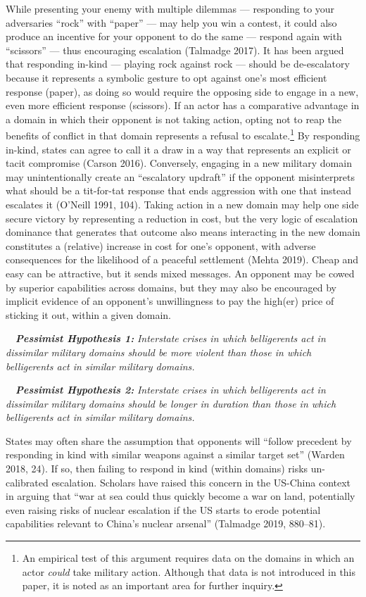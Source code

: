 \documentclass[
]{article}
\begin{document}
While presenting your enemy with multiple dilemmas --- responding to your adversaries ``rock'' with ``paper'' --- may help you win a contest, it could also produce an incentive for your opponent to do the same --- respond again with ``scissors'' --- thus encouraging escalation (Talmadge 2017). It has been argued that responding in-kind --- playing rock against rock --- should be de-escalatory because it represents a symbolic gesture to opt against one's most efficient response (paper), as doing so would require the opposing side to engage in a new, even more efficient response (scissors). If an actor has a comparative advantage in a domain in which their opponent is not taking action, opting not to reap the benefits of conflict in that domain represents a refusal to escalate.\footnote{An empirical test of this argument requires data on the domains in which an actor \emph{could} take military action. Although that data is not introduced in this paper, it is noted as an important area for further inquiry.} By responding in-kind, states can agree to call it a draw in a way that represents an explicit or tacit compromise (Carson 2016). Conversely, engaging in a new military domain may unintentionally create an ``escalatory updraft'' if the opponent misinterprets what should be a tit-for-tat response that ends aggression with one that instead escalates it (O'Neill 1991, 104). Taking action in a new domain may help one side secure victory by representing a reduction in cost, but the very logic of escalation dominance that generates that outcome also means interacting in the new domain constitutes a (relative) increase in cost for one's opponent, with adverse consequences for the likelihood of a peaceful settlement (Mehta 2019). Cheap and easy can be attractive, but it sends mixed messages. An opponent may be cowed by superior capabilities across domains, but they may also be encouraged by implicit evidence of an opponent's unwillingness to pay the high(er) price of sticking it out, within a given domain.

~~\textbf{\textit{Pessimist Hypothesis 1:}}\textit{ Interstate crises in which belligerents act in dissimilar military domains should be more violent than those in which belligerents act in similar military domains.}

~~\textbf{\textit{Pessimist Hypothesis 2:}}\textit{ Interstate crises in which belligerents act in dissimilar military domains should be longer in duration than those in which belligerents act in similar military domains.}

States may often share the assumption that opponents will ``follow precedent by responding in kind with similar weapons against a similar target set'' (Warden 2018, 24). If so, then failing to respond in kind (within domains) risks un-calibrated escalation. Scholars have raised this concern in the US-China context in arguing that ``war at sea could thus quickly become a war on land, potentially even raising risks of nuclear escalation if the US starts to erode potential capabilities relevant to China's nuclear arsenal'' (Talmadge 2019, 880--81).
\end{document}
